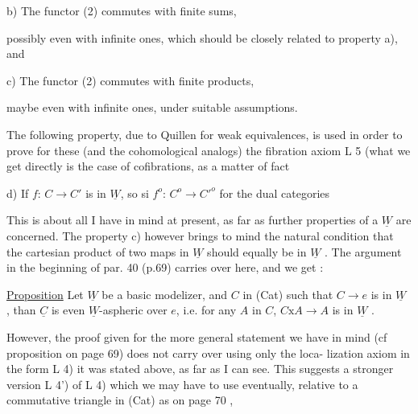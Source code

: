 
 b) The functor (2) commutes with finite sums,

possibly even with infinite ones, which should be closely related to
property a), and

 c) The functor (2) commutes with finite products,

\hand{(}maybe even with infinite ones, under suitable assumptions\hand{)}.

The following property, due to Quillen for weak equivalences, is
used in order to prove for these (and the cohomological analogs) the
fibration axiom L 5 (what we get directly is the case of cofibrations,
as a matter of fact

 d) If $f$: $C\to C'$ is in $\underline{W}$, so si $f^{o}$: $C^{o}\to C'^{o}$ for the dual categories

This is about all I have in mind at present, as far as further
properties of a $\underline{W}$ are concerned. The property c) however brings to 
mind the natural  condition that the cartesian product of two maps in $\underline{W}$
should equally be in $\underline{W}$ . The argument in the beginning of par. 40
(p.69) carries over here, and we get :

\uline{Proposition} Let $\underline{W}$ be a basic modelizer, and $C$ in (Cat) such that 
$C\to e$ is in $\underline{W}$ , than $\underline{C}$ is even $\underline{W}$-aspheric over $e$, i.e. for any $A$ in
$C$, $C\mathrm{x}A\to A$ is in $\underline{W}$ .

However, the proof given for the more general statement we have in
mind (cf proposition on page 69) does not carry over using only the loca-%
lization axiom in the form L 4) it was stated above, as far as I can
see. This suggests a  stronger version L 4') of L 4) which
we may have to use eventually, relative to a  commutative
triangle in (Cat) as on page 70
,

